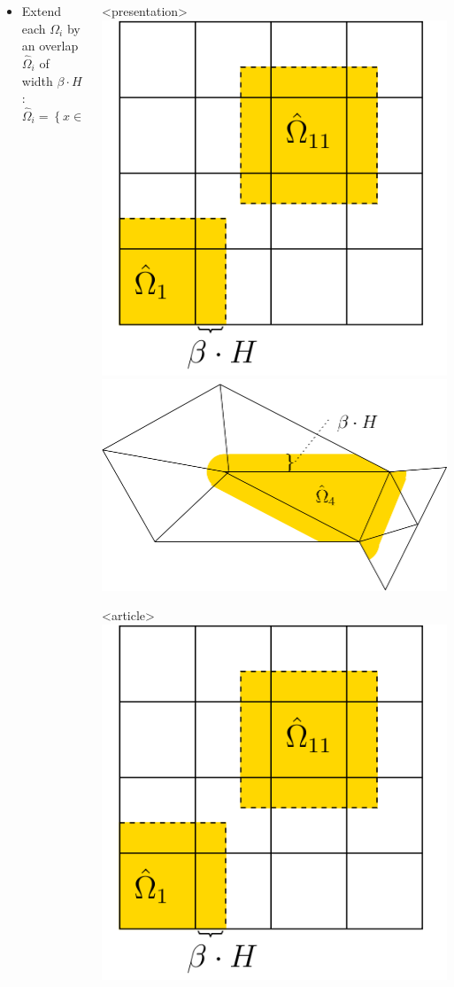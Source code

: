 \begin{frame}
\begin{columns}
\begin{column}{0.6\linewidth}
      \begin{itemize}
      \item Extend each $\Omega_i$ by an overlap $\hat \Omega_i$ of width
        $\beta\cdot H$:
        \[
        \hat \Omega_i = \left\{ x\in\Omega \mid \mathsf{dist}(x,\Omega_i) < \beta\cdot H \right\}
        \]
      \end{itemize}
    \end{column}
    \begin{column}{0.4\linewidth}
      \begin{onlyenv}<presentation>
        \includegraphics[width=0.6\linewidth]{EPS/konstr_uberl_str}
        \vskip5mm
        \includegraphics[width=0.9\linewidth]{EPS/konstr_uberl_unstr}
      \end{onlyenv}
      \begin{onlyenv}<article>
        \includegraphics[width=.25\linewidth]{EPS/konstr_uberl_str}

\end{onlyenv}
\end{column}
\end{columns}
\end{frame}
